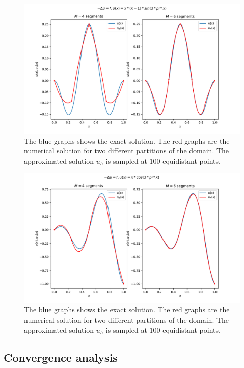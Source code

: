 \begin{figure}
  \centering
  \includegraphics[width=\textwidth]{Images/plots/task1_test_sol1.pdf}
  \caption{The blue graphs shows the exact solution.
  The red graphs are the numerical solution for two
different partitions of the domain.
The approximated solution \( u_h \) is sampled at \( 100 \)
equidistant points.}
  \label{fig:test_eq1}
\end{figure}

\begin{figure}
  \centering
  \includegraphics[width=\textwidth]{Images/plots/task1_test_sol2.pdf}
  \caption{The blue graphs shows the exact solution.
  The red graphs are the numerical solution for two
different partitions of the domain.
The approximated solution \( u_h \) is sampled at \( 100 \)
equidistant points.}
  \label{fig:test_eq2}
\end{figure}

\subsection{Convergence analysis}


